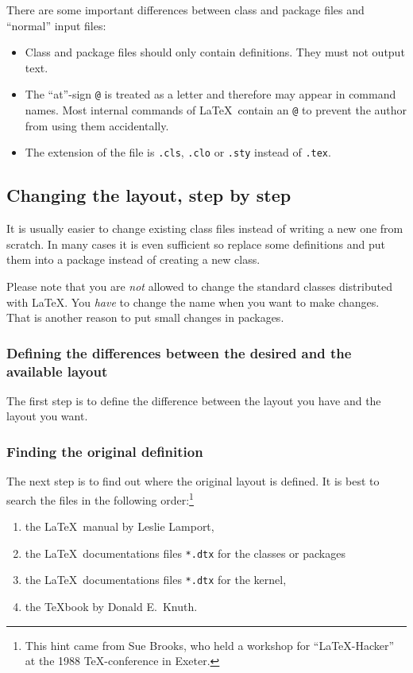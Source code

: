 \documentclass[twoside,a4paper]{refart}
\begin{document}
There are some important differences between class and package files 
and ``normal'' input files:
\begin{itemize}
\item
        Class and package files should only contain definitions. They must 
        not output text.
\item
        The ``at''-sign \texttt{@} is treated as a letter and therefore may 
        appear in command names. Most internal commands of \LaTeX\ contain 
        an \texttt{@} to prevent the author from using them accidentally.
\item
        The extension of the file is \texttt{.cls}, \texttt{.clo} or 
        \texttt{.sty} instead of \texttt{.tex}.
\end{itemize}

\subsection{Changing the layout, step by step}

It is usually easier to change existing class files instead of 
writing a new one from scratch. In many cases it is even sufficient 
so replace some definitions and put them into a package instead of 
creating a new class.

Please note that you are \emph{not} allowed to change the standard 
classes distributed with \LaTeX. You \emph{have} to change the name 
when you want to make changes. That is another reason to put small 
changes in packages.

\subsubsection{Defining the differences between the desired  and 
the available layout}

The first step is to define the difference between the layout you have 
and the layout you want. 

\subsubsection{Finding the original definition}

The next step is to find out where the original layout is defined.  It 
is best to search the files in the following order:\footnote{This hint 
came from Sue Brooks, who held a workshop for ``\LaTeX-Hacker'' at the 
1988 \TeX-conference in Exeter.}
\begin{enumerate}
\item the \LaTeX\ manual by Leslie Lamport,
\item the \LaTeX\ documentations files \texttt{*.dtx} for the classes 
or packages
\item the \LaTeX\ documentations files \texttt{*.dtx} for the kernel,
\item the \TeX book by Donald E.~Knuth.
\end{enumerate}
\end{document}
